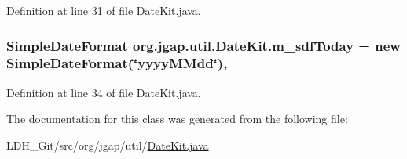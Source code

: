 Definition at line 31 of file Date\-Kit.\-java.

\hypertarget{classorg_1_1jgap_1_1util_1_1_date_kit_a97e98a68f3fdd21c2839de2de65b1f56}{
\subsubsection[{m\-\_\-sdf\-Today}]{\setlength{\rightskip}{0pt plus 5cm}Simple\-Date\-Format org.\-jgap.\-util.\-Date\-Kit.\-m\-\_\-sdf\-Today = new Simple\-Date\-Format(\char`\"{}yyyy\-M\-Mdd\char`\"{})\hspace{0.3cm}{\ttfamily [static]}, {\ttfamily [private]}}}\label{classorg_1_1jgap_1_1util_1_1_date_kit_a97e98a68f3fdd21c2839de2de65b1f56}


Definition at line 34 of file Date\-Kit.\-java.



The documentation for this class was generated from the following file\-:\begin{DoxyCompactItemize}
\item 
L\-D\-H\-\_\-\-Git/src/org/jgap/util/\hyperlink{_date_kit_8java}{Date\-Kit.\-java}\end{DoxyCompactItemize}
